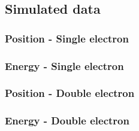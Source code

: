 \subsection{Simulated data}
\subsubsection{Position - Single electron}


\subsubsection{Energy - Single electron}


\subsubsection{Position - Double electron}


\subsubsection{Energy - Double electron}


